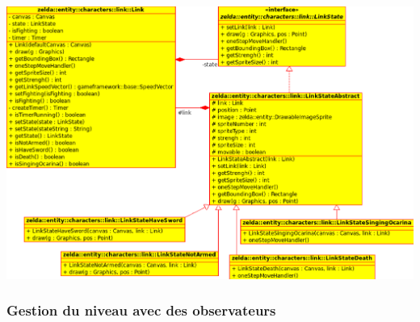\documentclass[a4paper,11pt]{article}
\begin{document}
\begin{center}
 \includegraphics[scale=0.8]{images/Statediagram.eps}
\end{center}
 
\subsubsection*{Gestion du niveau avec des observateurs}
 
\end{document}
